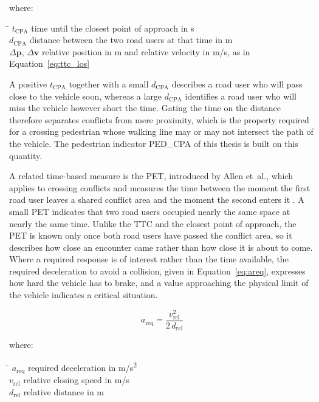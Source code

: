 where:\nopagebreak
\begin{tabbing}
    \hspace{2.2cm} \= \kill
    $t_\mathrm{CPA}$ \> time until the closest point of approach in s \\
    $d_\mathrm{CPA}$ \> distance between the two road users at that time in m \\
    $\Delta\mathbf{p}$, $\Delta\mathbf{v}$ \> relative position in m and relative velocity in m/s, as in
    Equation~\eqref{eq:ttc_los}
\end{tabbing}

A positive $t_\mathrm{CPA}$ together with a small $d_\mathrm{CPA}$ describes a road
user who will pass close to the vehicle soon, whereas a large $d_\mathrm{CPA}$
identifies a road user who will miss the vehicle however short the time. Gating the
time on the distance therefore separates conflicts from mere proximity, which is the
property required for a crossing pedestrian whose walking line may or may not
intersect the path of the vehicle. The pedestrian indicator PED\_CPA of this thesis is
built on this quantity.

A related time-based measure is the \ac{PET}, introduced by Allen et~al., which
applies to crossing conflicts and measures the time between the moment the first road
user leaves a shared conflict area and the moment the second enters it
\cite{allen1978pet}. A small \ac{PET} indicates that two road users occupied nearly
the same space at nearly the same time. Unlike the \ac{TTC} and the closest point of
approach, the \ac{PET} is known only once both road users have passed the conflict
area, so it describes how close an encounter came rather than how close it is about
to come. Where a required response is of interest rather than the time available, the
required deceleration to avoid a collision, given in Equation~\eqref{eq:areq}, expresses
how hard the vehicle has to brake, and a value approaching the physical limit
of the vehicle indicates a critical situation.

\begin{equation}
    a_\mathrm{req} = \frac{v_\mathrm{rel}^{2}}{2\,d_\mathrm{rel}}
    \label{eq:areq}
\end{equation}

where:\nopagebreak
\begin{tabbing}
    \hspace{2.2cm} \= \kill
    $a_\mathrm{req}$ \> required deceleration in m/s\textsuperscript{2} \\
    $v_\mathrm{rel}$ \> relative closing speed in m/s \\
    $d_\mathrm{rel}$ \> relative distance in m
\end{tabbing}

